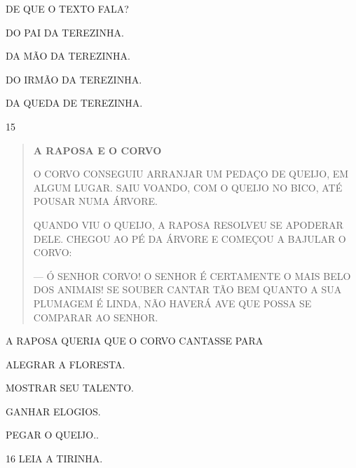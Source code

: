 DE QUE O TEXTO FALA?

\begin{escolha}
\item DO PAI DA TEREZINHA.

\item DA MÃO DA TEREZINHA.

\item DO IRMÃO DA TEREZINHA.

\item DA QUEDA DE TEREZINHA.
\end{escolha}

\num{15} \enlargethispage{2\baselineskip}

\begin{quote}
\textbf{A RAPOSA E O CORVO}

O CORVO CONSEGUIU ARRANJAR UM PEDAÇO DE QUEIJO, EM ALGUM
LUGAR. SAIU VOANDO, COM O QUEIJO NO BICO, ATÉ POUSAR NUMA
ÁRVORE.

QUANDO VIU O QUEIJO, A RAPOSA RESOLVEU SE APODERAR
DELE. CHEGOU AO PÉ DA ÁRVORE E COMEÇOU A BAJULAR O CORVO:

--- Ó SENHOR CORVO! O SENHOR É CERTAMENTE O MAIS BELO
DOS ANIMAIS! SE SOUBER CANTAR TÃO BEM QUANTO A SUA PLUMAGEM
É LINDA, NÃO HAVERÁ AVE QUE POSSA SE COMPARAR AO SENHOR.

\end{quote}

A RAPOSA QUERIA QUE O CORVO CANTASSE PARA

\begin{escolha}
\item ALEGRAR A FLORESTA.

\item MOSTRAR SEU TALENTO.

\item GANHAR ELOGIOS.

\item PEGAR O QUEIJO..
\end{escolha}

\num{16} LEIA A TIRINHA.

